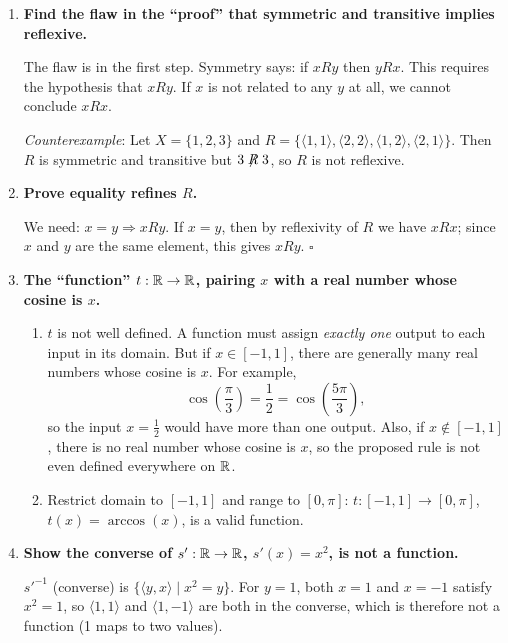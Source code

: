 \begin{enumerate}[{0.}1. ]
\item \textbf{Find the flaw in the ``proof'' that symmetric and transitive implies reflexive.}

The flaw is in the first step. Symmetry says: if $x R y$ then $y R x$. This requires the hypothesis that $x R y$. If $x$ is not related to any $y$ at all, we cannot conclude $x R x$.

\textit{Counterexample}: Let $X = \{1,2,3\}$ and $R = \{\langle 1,1\rangle, \langle 2,2\rangle, \langle 1,2\rangle, \langle 2,1\rangle\}$. Then $R$ is symmetric and transitive but $3 \not\mathrel{R} 3$, so $R$ is not reflexive.

\item \textbf{Prove equality refines $R$.}

We need: $x = y \Rightarrow x R y$. If $x = y$, then by reflexivity of $R$ we
have $x R x$; since $x$ and $y$ are the same element, this gives $x R y$.
$\square$

\item \textbf{The ``function'' $t: \mathbb{R} \to \mathbb{R}$, pairing $x$ with a real number whose cosine is $x$.}

\begin{enumerate}
\item $t$ is not well defined. A function must assign \emph{exactly one} output to each input in its domain. But if $x \in [-1,1]$, there are generally many real numbers whose cosine is $x$. For example,
\[
\cos \left(\frac{\pi}{3}\right)=\frac{1}{2}=\cos \left(\frac{5\pi}{3}\right),
\]
so the input $x=\frac{1}{2}$ would have more than one output. Also, if $x\notin[-1,1]$, there is no real number whose cosine is $x$, so the proposed rule is not even defined everywhere on $\mathbb{R}$.

\item Restrict domain to $[-1,1]$ and range to $[0,\pi]$: $t: [-1,1] \to [0,\pi]$, $t(x) = \arccos(x)$, is a valid function.
\end{enumerate}

\item \textbf{Show the converse of $s': \mathbb{R} \to \mathbb{R}$, $s'(x)=x^2$, is not a function.}

$s'^{-1}$ (converse) is $\{\langle y, x\rangle \mid x^2 = y\}$. For $y = 1$, both $x=1$ and $x=-1$ satisfy $x^2=1$, so $\langle 1,1\rangle$ and $\langle 1,-1\rangle$ are both in the converse, which is therefore not a function (1 maps to two values).


\end{enumerate}
